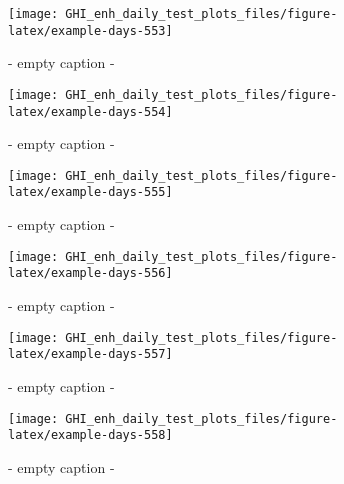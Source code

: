 \documentclass[
  10pt,
  a4paper,oneside]{article}
\begin{document}
\begin{figure}[H]

{\centering \texttt{[image: GHI\_enh\_daily\_test\_plots\_files/figure-latex/example-days-553]} 

}

\caption{ - empty caption - }\label{fig:example-days-553}
\end{figure}

\begin{figure}[H]

{\centering \texttt{[image: GHI\_enh\_daily\_test\_plots\_files/figure-latex/example-days-554]} 

}

\caption{ - empty caption - }\label{fig:example-days-554}
\end{figure}

\begin{figure}[H]

{\centering \texttt{[image: GHI\_enh\_daily\_test\_plots\_files/figure-latex/example-days-555]} 

}

\caption{ - empty caption - }\label{fig:example-days-555}
\end{figure}

\begin{figure}[H]

{\centering \texttt{[image: GHI\_enh\_daily\_test\_plots\_files/figure-latex/example-days-556]} 

}

\caption{ - empty caption - }\label{fig:example-days-556}
\end{figure}

\begin{figure}[H]

{\centering \texttt{[image: GHI\_enh\_daily\_test\_plots\_files/figure-latex/example-days-557]} 

}

\caption{ - empty caption - }\label{fig:example-days-557}
\end{figure}

\begin{figure}[H]

{\centering \texttt{[image: GHI\_enh\_daily\_test\_plots\_files/figure-latex/example-days-558]} 

}

\caption{ - empty caption - }\label{fig:example-days-558}
\end{figure}
\end{document}
